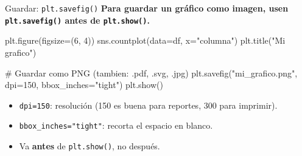 \documentclass[aspectratio=169, 11pt]{beamer}
\begin{document}
\begin{frame}[fragile,shrink=28]{Guardar: \texttt{plt.savefig()}}
  \vspace{-6pt}
  {\footnotesize\color{arcaDark}\bfseries
    Para guardar un gráfico como imagen, usen \texttt{plt.savefig()}
    \textbf{antes} de \texttt{plt.show()}.}

  \vspace{4pt}
  \begin{pyblock}
plt.figure(figsize=(6, 4))
sns.countplot(data=df, x="columna")
plt.title("Mi grafico")

# Guardar como PNG (tambien: .pdf, .svg, .jpg)
plt.savefig("mi_grafico.png", dpi=150,
            bbox_inches="tight")
plt.show()
  \end{pyblock}

  \vspace{4pt}
  {\scriptsize\color{textMuted}
  \begin{itemize}\setlength{\itemsep}{3pt}
    \item[{\color{arcaRed}\scriptsize\faArrowRight}]
      \texttt{dpi=150}: resolución (150 es buena para reportes,
      300 para imprimir).
    \item[{\color{arcaRed}\scriptsize\faArrowRight}]
      \texttt{bbox\_inches="tight"}: recorta el espacio en blanco.
    \item[{\color{arcaRed}\scriptsize\faArrowRight}]
      Va \textbf{antes} de \texttt{plt.show()}, no después.
  \end{itemize}
  }
\end{frame}
\end{document}
